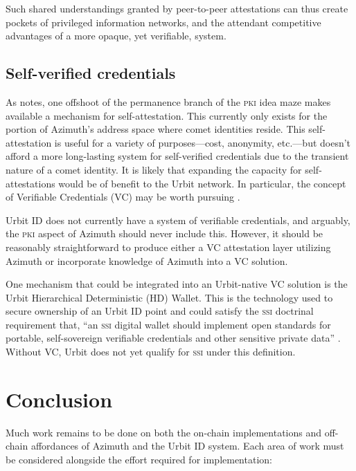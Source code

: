 \documentclass[twoside]{article}
\begin{document}

Such shared understandings granted by peer-to-peer attestations can thus create pockets of privileged information networks, and the attendant competitive advantages of a more opaque, yet verifiable, system.

\subsection{Self-verified credentials}

As  notes, one offshoot of the permanence branch of the \textsc{pki} idea maze makes available a mechanism for self-attestation. This currently only exists for the portion of Azimuth's address space where comet identities reside. This self-attestation is useful for a variety of purposes—cost, anonymity, etc.—but doesn't afford a more long-lasting system for self-verified credentials due to the transient nature of a comet identity. It is likely that expanding the capacity for self-attestations would be of benefit to the Urbit network. In particular, the concept of Verifiable Credentials (VC) may be worth pursuing \citep{W3C2022a}.

Urbit ID does not currently have a system of verifiable credentials, and arguably, the \textsc{pki} aspect of Azimuth should never include this. However, it should be reasonably straightforward to produce either a VC attestation layer utilizing Azimuth or incorporate knowledge of Azimuth into a VC solution.

One mechanism that could be integrated into an Urbit-native VC solution is the Urbit Hierarchical Deterministic (HD) Wallet. This is the technology used to secure ownership of an Urbit ID point and could satisfy the \textsc{ssi} doctrinal requirement that, ``an \textsc{ssi} digital wallet should implement open standards for portable, self-sovereign verifiable credentials and other sensitive private data'' \citep{Preukschat2021}. Without VC, Urbit does not yet qualify for \textsc{ssi} under this definition.


\section{Conclusion}

Much work remains to be done on both the on-chain implementations and off-chain affordances of Azimuth and the Urbit ID system. Each area of work must be considered alongside the effort required for implementation:
\end{document}
